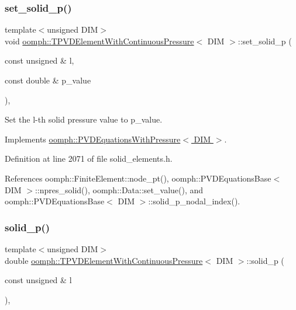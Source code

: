 \subsubsection{\texorpdfstring{set\+\_\+solid\+\_\+p()}{set\_solid\_p()}}
{\footnotesize\ttfamily template$<$unsigned D\+IM$>$ \\
void \hyperlink{classoomph_1_1TPVDElementWithContinuousPressure}{oomph\+::\+T\+P\+V\+D\+Element\+With\+Continuous\+Pressure}$<$ D\+IM $>$\+::set\+\_\+solid\+\_\+p (\begin{DoxyParamCaption}\item[{const unsigned \&}]{l,  }\item[{const double \&}]{p\+\_\+value }\end{DoxyParamCaption})\hspace{0.3cm}{\ttfamily [inline]}, {\ttfamily [virtual]}}



Set the l-\/th solid pressure value to p\+\_\+value. 



Implements \hyperlink{classoomph_1_1PVDEquationsWithPressure_a35b462a689e05929fa15a9abd2b920f0}{oomph\+::\+P\+V\+D\+Equations\+With\+Pressure$<$ D\+I\+M $>$}.



Definition at line 2071 of file solid\+\_\+elements.\+h.



References oomph\+::\+Finite\+Element\+::node\+\_\+pt(), oomph\+::\+P\+V\+D\+Equations\+Base$<$ D\+I\+M $>$\+::npres\+\_\+solid(), oomph\+::\+Data\+::set\+\_\+value(), and oomph\+::\+P\+V\+D\+Equations\+Base$<$ D\+I\+M $>$\+::solid\+\_\+p\+\_\+nodal\+\_\+index().

\mbox{\label{classoomph_1_1TPVDElementWithContinuousPressure_aa0a9aad423ffe12eb10f07af6850191c}} 
\subsubsection{\texorpdfstring{solid\+\_\+p()}{solid\_p()}}
{\footnotesize\ttfamily template$<$unsigned D\+IM$>$ \\
double \hyperlink{classoomph_1_1TPVDElementWithContinuousPressure}{oomph\+::\+T\+P\+V\+D\+Element\+With\+Continuous\+Pressure}$<$ D\+IM $>$\+::solid\+\_\+p (\begin{DoxyParamCaption}\item[{const unsigned \&}]{l }\end{DoxyParamCaption})\hspace{0.3cm}{\ttfamily [inline]}, {\ttfamily [virtual]}}

